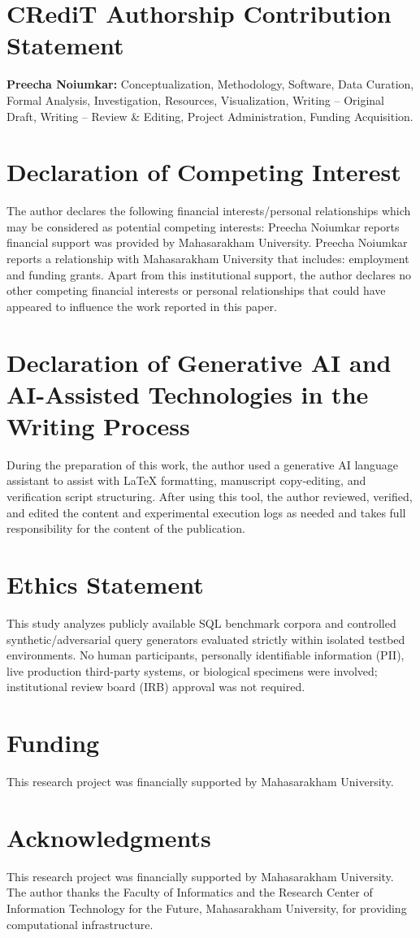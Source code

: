 \documentclass[preprint,12pt]{elsarticle}
\begin{document}
\section*{CRediT Authorship Contribution Statement}
\textbf{Preecha Noiumkar:} Conceptualization, Methodology, Software, Data Curation, Formal Analysis, Investigation, Resources, Visualization, Writing -- Original Draft, Writing -- Review \& Editing, Project Administration, Funding Acquisition.

\section*{Declaration of Competing Interest}
The author declares the following financial interests/personal relationships which may be considered as potential competing interests: Preecha Noiumkar reports financial support was provided by Mahasarakham University. Preecha Noiumkar reports a relationship with Mahasarakham University that includes: employment and funding grants. Apart from this institutional support, the author declares no other competing financial interests or personal relationships that could have appeared to influence the work reported in this paper.

\section*{Declaration of Generative AI and AI-Assisted Technologies in the Writing Process}
During the preparation of this work, the author used a generative AI language assistant to assist with \LaTeX{} formatting, manuscript copy-editing, and verification script structuring. After using this tool, the author reviewed, verified, and edited the content and experimental execution logs as needed and takes full responsibility for the content of the publication.

\section*{Ethics Statement}
This study analyzes publicly available SQL benchmark corpora and controlled synthetic/adversarial query generators evaluated strictly within isolated testbed environments. No human participants, personally identifiable information (PII), live production third-party systems, or biological specimens were involved; institutional review board (IRB) approval was not required.

\section*{Funding}
This research project was financially supported by Mahasarakham University.

\section*{Acknowledgments}
This research project was financially supported by Mahasarakham University. The author thanks the Faculty of Informatics and the Research Center of Information Technology for the Future, Mahasarakham University, for providing computational infrastructure.



\end{document}
